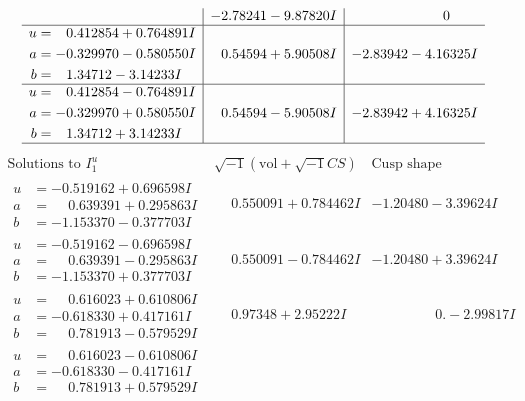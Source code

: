 \documentclass[1p]{elsarticle_modified}
\theoremstyle{definition}
\newcommand{\I}{\sqrt{-1}}
\begin{document}
$$\begin{array}{c|c|c}
 & -2.78241 - 9.87820 I & \phantom{-0.000000 } 0 \\ \hline\begin{aligned}
u &= \phantom{-}0.412854 + 0.764891 I \\
a &= -0.329970 - 0.580550 I \\
b &= \phantom{-}1.34712 - 3.14233 I\end{aligned}
 & \phantom{-}0.54594 + 5.90508 I & -2.83942 - 4.16325 I \\ \hline\begin{aligned}
u &= \phantom{-}0.412854 - 0.764891 I \\
a &= -0.329970 + 0.580550 I \\
b &= \phantom{-}1.34712 + 3.14233 I\end{aligned}
 & \phantom{-}0.54594 - 5.90508 I & -2.83942 + 4.16325 I\\
 \hline 
 \end{array}$$\newpage$$\begin{array}{c|c|c}  
\text{Solutions to }I^u_{1}& \I (\text{vol} + \sqrt{-1}CS) & \text{Cusp shape}\\
 \hline 
\begin{aligned}
u &= -0.519162 + 0.696598 I \\
a &= \phantom{-}0.639391 + 0.295863 I \\
b &= -1.153370 - 0.377703 I\end{aligned}
 & \phantom{-}0.550091 + 0.784462 I & -1.20480 - 3.39624 I \\ \hline\begin{aligned}
u &= -0.519162 - 0.696598 I \\
a &= \phantom{-}0.639391 - 0.295863 I \\
b &= -1.153370 + 0.377703 I\end{aligned}
 & \phantom{-}0.550091 - 0.784462 I & -1.20480 + 3.39624 I \\ \hline\begin{aligned}
u &= \phantom{-}0.616023 + 0.610806 I \\
a &= -0.618330 + 0.417161 I \\
b &= \phantom{-}0.781913 - 0.579529 I\end{aligned}
 & \phantom{-}0.97348 + 2.95222 I & \phantom{-0.000000 } 0. - 2.99817 I \\ \hline\begin{aligned}
u &= \phantom{-}0.616023 - 0.610806 I \\
a &= -0.618330 - 0.417161 I \\
b &= \phantom{-}0.781913 + 0.579529 I\end{aligned}

\end{array}$$
\end{document}

